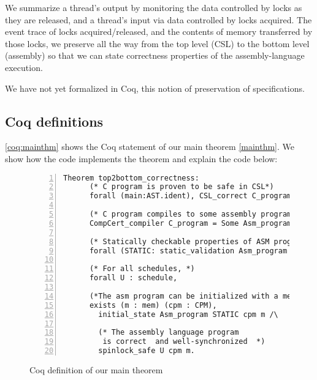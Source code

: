 We summarize a thread's output
by monitoring the data controlled by locks as they are released,
and a thread's input via data controlled by locks acquired.
The event trace of locks acquired/released, and the contents of memory 
transferred by those locks, we preserve all the way from the
top level (CSL) to the bottom level (assembly) 
so that we can state correctness properties of
the assembly-language execution.

We have not yet formalized in Coq, this notion of preservation of specifications.


\subsection{Coq definitions}\label{sec:coqmainthm}


 

\autoref{coq:mainthm} shows the Coq statement of our main theorem 
\hyperlink{mainthm-formal}{\ref*{mainthm}}. We show how the code implements the theorem and explain the code below:



\begin{figure}
\begin{lstlisting}[numbers=left]
  Theorem top2bottom_correctness:
      (* C program is proven to be safe in CSL*)
      forall (main:AST.ident), CSL_correct C_program main  ->

      (* C program compiles to some assembly program*)
      CompCert_compiler C_program = Some Asm_program ->
        
      (* Statically checkable properties of ASM program *)
      forall (STATIC: static_validation Asm_program main),

      (* For all schedules, *)
      forall U : schedule,
        
      (*The asm program can be initialized with a memory and CPM state*)
      exists (m : mem) (cpm : CPM),
        initial_state Asm_program STATIC cpm m /\
        
        (* The assembly language program 
         is correct  and well-synchronized  *)
        spinlock_safe U cpm m.
\end{lstlisting}
\caption{Coq definition of our main theorem}\label{coq:mainthm}
\end{figure}

